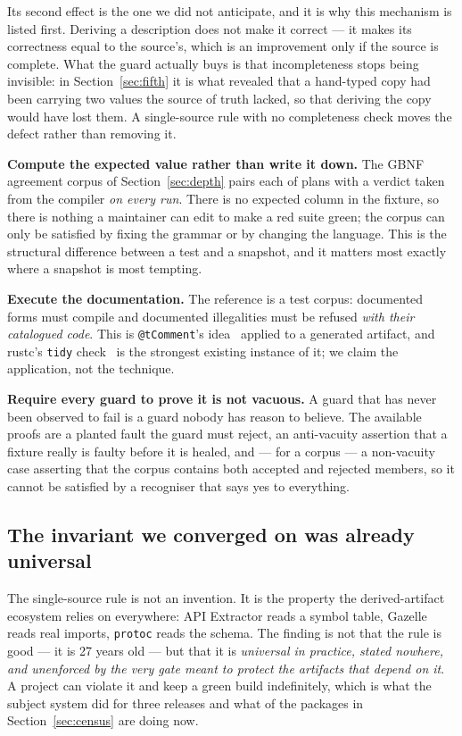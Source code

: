 \documentclass[10pt,journal,compsoc]{IEEEtran}
\begin{document}
Its second effect is the one we did not anticipate, and it is why this mechanism is listed
first. Deriving a description does not make it correct --- it makes its correctness equal to
the source's, which is an improvement only if the source is complete. What the guard actually
buys is that incompleteness stops being invisible: in Section~\ref{sec:fifth} it is what
revealed that a hand-typed copy had been carrying two values the source of truth lacked, so
that deriving the copy would have lost them. A single-source rule with no completeness check
moves the defect rather than removing it.

\textbf{Compute the expected value rather than write it down.} The GBNF agreement corpus
of Section~\ref{sec:depth} pairs each of \factGbnfCorpus{} plans with a verdict taken
from the compiler \emph{on every run}. There is no expected column in the fixture, so
there is nothing a maintainer can edit to make a red suite green; the corpus can only be
satisfied by fixing the grammar or by changing the language. This is the structural
difference between a test and a snapshot, and it matters most exactly where a snapshot
is most tempting.

\textbf{Execute the documentation.} The reference is a test corpus:
\factSpecFormsCompile{} documented forms must compile and \factSpecFormsRefused{}
documented illegalities must be refused \emph{with their catalogued code}. This is
\texttt{@tComment}'s idea~\cite{tan2012tcomment} applied to a generated artifact, and
rustc's \texttt{tidy} check~\cite{rustc_tidy_errorcodes} is the strongest existing
instance of it; we claim the application, not the technique.

\textbf{Require every guard to prove it is not vacuous.} A guard that has never been
observed to fail is a guard nobody has reason to believe. The available proofs are a
planted fault the guard must reject, an anti-vacuity assertion that a fixture really is
faulty before it is healed, and --- for a corpus --- a non-vacuity case asserting that
the corpus contains both accepted and rejected members, so it cannot be satisfied by a
recogniser that says yes to everything.

\subsection{The invariant we converged on was already universal}

The single-source rule is not an invention. It is the property the derived-artifact
ecosystem relies on everywhere: API Extractor reads a symbol table, Gazelle reads real
imports, \texttt{protoc} reads the schema. The finding is not that the rule is good ---
it is 27 years old --- but that it is \emph{universal in practice, stated nowhere, and
unenforced by the very gate meant to protect the artifacts that depend on it}. A project
can violate it and keep a green build indefinitely, which is what the subject system did
for three releases and what \factEcoRetypedPct{} of the packages in
Section~\ref{sec:census} are doing now.
\end{document}

